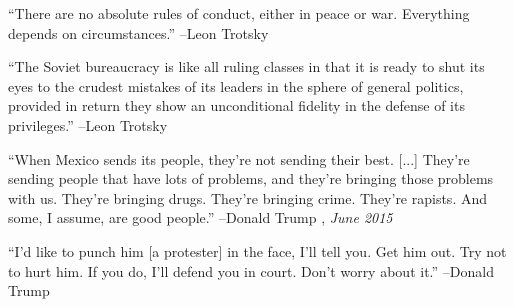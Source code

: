 \documentclass{article}%
\begin{document}
\linebreak%
\vspace{1mm}%
\begin{minipage}{\textwidth}%
\flushleft%
“There are no absolute rules of conduct, either in peace or war. Everything depends on circumstances.”%
\linebreak%
\vspace{1mm}%
–Leon Trotsky%
\linebreak%
\vspace{1mm}%
\end{minipage}%
\linebreak%
\vspace{1mm}%
\begin{minipage}{\textwidth}%
\flushleft%
“The Soviet bureaucracy is like all ruling classes in that it is ready to shut its eyes to the crudest mistakes of its leaders in the sphere of general politics, provided in return they show an unconditional fidelity in the defense of its privileges.”%
\linebreak%
\vspace{1mm}%
–Leon Trotsky%
\linebreak%
\vspace{1mm}%
\end{minipage}%
\linebreak%
\vspace{1mm}%
\begin{minipage}{\textwidth}%
\flushleft%
“When Mexico sends its people, they're not sending their best. {[}...{]} They're sending people that have lots of problems, and they're bringing those problems with us. They're bringing drugs. They're bringing crime. They're rapists. And some, I assume, are good people.”%
\linebreak%
\vspace{1mm}%
–Donald Trump%
, \textit{June 2015}%
\linebreak%
\vspace{1mm}%
\end{minipage}%
\linebreak%
\vspace{1mm}%
\begin{minipage}{\textwidth}%
\flushleft%
“I'd like to punch him {[}a protester{]} in the face, I'll tell you. Get him out. Try not to hurt him. If you do, I'll defend you in court. Don't worry about it.”%
\linebreak%
\vspace{1mm}%
–Donald Trump%
\linebreak%
\vspace{1mm}%
\end{minipage}%
\end{document}
